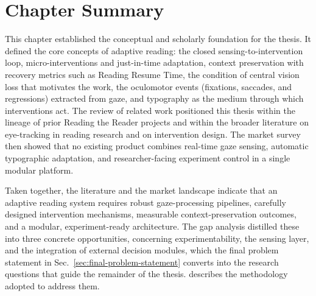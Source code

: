 \section{Chapter Summary}
\label{sec:ch2-summary}
This chapter established the conceptual and scholarly foundation for the thesis.
It defined the core concepts of adaptive reading: the closed sensing-to-intervention loop, micro-interventions and just-in-time adaptation, context preservation with recovery metrics such as Reading Resume Time, the condition of central vision loss that motivates the work, the oculomotor events (fixations, saccades, and regressions) extracted from gaze, and typography as the medium through which interventions act.
The review of related work positioned this thesis within the lineage of prior Reading the Reader projects \cite{refsgaard2024rtr, pereira2024typography, palinec2024reactive} and within the broader literature on eye-tracking in reading research and on intervention design.
The market survey then showed that no existing product combines real-time gaze sensing, automatic typographic adaptation, and researcher-facing experiment control in a single modular platform.

Taken together, the literature and the market landscape indicate that an adaptive reading system requires robust gaze-processing pipelines, carefully designed intervention mechanisms, measurable context-preservation outcomes, and a modular, experiment-ready architecture.
The gap analysis distilled these into three concrete opportunities, concerning experimentability, the sensing layer, and the integration of external decision modules, which the final problem statement in Sec.~\ref{sec:final-problem-statement} converts into the research questions that guide the remainder of the thesis.
 describes the methodology adopted to address them.
